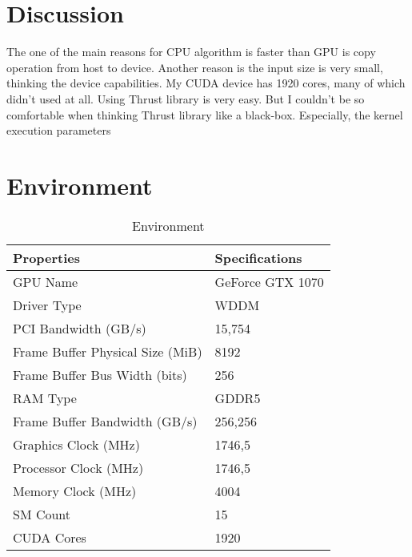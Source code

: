 \documentclass[11pt]{article} %
\begin{document}
\section{Discussion}
	\justifying The one of the main reasons for CPU algorithm is faster than GPU is copy operation from host to device. Another reason is the input size is very small, thinking the device capabilities. My CUDA device has 1920 cores, many of which didn't used at all. Using Thrust library is very easy.  But I couldn't be so comfortable when thinking Thrust library like a black-box. Especially, the kernel execution parameters \\
	
\section{Environment}
	\begin{table}[!htbp]
		\centering
		\caption{Environment}		
		\label{tab:addlabel}%
		\begin{tabular}{ll}
			Properties & Specifications \\\hline  
			GPU Name & GeForce GTX 1070 \\  
			Driver Type & WDDM \\  
			PCI Bandwidth (GB/s) & 15,754 \\  
			Frame Buffer Physical Size (MiB) & 8192 \\  
			Frame Buffer Bus Width (bits) & 256 \\  
			RAM Type & GDDR5 \\  
			Frame Buffer Bandwidth (GB/s) & 256,256 \\  
			Graphics Clock (MHz) & 1746,5 \\  
			Processor Clock (MHz) & 1746,5 \\  
			Memory Clock (MHz) & 4004 \\  
			SM Count & 15 \\  
			CUDA Cores & 1920 \\  
		\end{tabular}%
	\end{table}%
\end{document}
